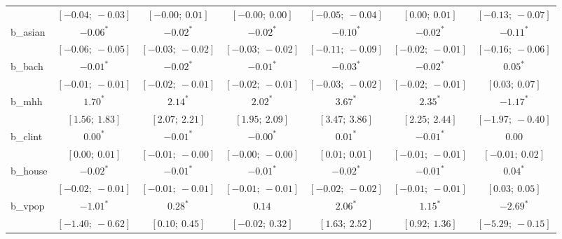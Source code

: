 \begin{table}
\begin{center}
\begin{tabular}{l c c c c c c }
          & $[-0.04;\ -0.03]$         & $[-0.00;\ 0.01]$          & $[-0.00;\ 0.00]$          & $[-0.05;\ -0.04]$       & $[0.00;\ 0.01]$           & $[-0.13;\ -0.07]$     \\
b\_asian  & $-0.06^{*}$               & $-0.02^{*}$               & $-0.02^{*}$               & $-0.10^{*}$             & $-0.02^{*}$               & $-0.11^{*}$           \\
          & $[-0.06;\ -0.05]$         & $[-0.03;\ -0.02]$         & $[-0.03;\ -0.02]$         & $[-0.11;\ -0.09]$       & $[-0.02;\ -0.01]$         & $[-0.16;\ -0.06]$     \\
b\_bach   & $-0.01^{*}$               & $-0.02^{*}$               & $-0.01^{*}$               & $-0.03^{*}$             & $-0.02^{*}$               & $0.05^{*}$            \\
          & $[-0.01;\ -0.01]$         & $[-0.02;\ -0.01]$         & $[-0.02;\ -0.01]$         & $[-0.03;\ -0.02]$       & $[-0.02;\ -0.01]$         & $[0.03;\ 0.07]$       \\
b\_mhh    & $1.70^{*}$                & $2.14^{*}$                & $2.02^{*}$                & $3.67^{*}$              & $2.35^{*}$                & $-1.17^{*}$           \\
          & $[1.56;\ 1.83]$           & $[2.07;\ 2.21]$           & $[1.95;\ 2.09]$           & $[3.47;\ 3.86]$         & $[2.25;\ 2.44]$           & $[-1.97;\ -0.40]$     \\
b\_clint  & $0.00^{*}$                & $-0.01^{*}$               & $-0.00^{*}$               & $0.01^{*}$              & $-0.01^{*}$               & $0.00$                \\
          & $[0.00;\ 0.01]$           & $[-0.01;\ -0.00]$         & $[-0.00;\ -0.00]$         & $[0.01;\ 0.01]$         & $[-0.01;\ -0.01]$         & $[-0.01;\ 0.02]$      \\
b\_house  & $-0.02^{*}$               & $-0.01^{*}$               & $-0.01^{*}$               & $-0.02^{*}$             & $-0.01^{*}$               & $0.04^{*}$            \\
          & $[-0.02;\ -0.01]$         & $[-0.01;\ -0.01]$         & $[-0.01;\ -0.01]$         & $[-0.02;\ -0.02]$       & $[-0.01;\ -0.01]$         & $[0.03;\ 0.05]$       \\
b\_vpop   & $-1.01^{*}$               & $0.28^{*}$                & $0.14$                    & $2.06^{*}$              & $1.15^{*}$                & $-2.69^{*}$           \\
          & $[-1.40;\ -0.62]$         & $[0.10;\ 0.45]$           & $[-0.02;\ 0.32]$          & $[1.63;\ 2.52]$         & $[0.92;\ 1.36]$           & $[-5.29;\ -0.15]$     \\

\end{tabular}
\end{center}
\end{table}

